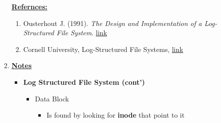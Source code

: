 \documentclass[12pt]{article}
\begin{document}
\begin{enumerate}[1.]
\begin{enumerate}[1)]
        \bigskip

        \underline{\textbf{Refernces:}}

        \bigskip

        \begin{enumerate}[1)]
            \item Ousterhout J. (1991). \textit{The Design and Implementation of a Log-Structured File System}. \href{https://people.eecs.berkeley.edu/~brewer/cs262/LFS.pdf}{link}
            \item Cornell University, Log-Structured File Systems, \href{http://www.cs.cornell.edu/courses/cs4410/2015su/lectures/lec20-lfs.html#:~:text=The%20downside%20of%20storing%20the,or%20inode)%20in%20the%20segment.}{link}
        \end{enumerate}

        \item

        \bigskip

        \underline{\textbf{Notes}}

        \begin{itemize}
            \item \textbf{Log Structured File System (cont')}
            \begin{itemize}
                \item Data Block
                \begin{itemize}
                    \item Is found by looking for \textbf{inode} that point to it
                \end{itemize}

                \bigskip


\end{itemize}
\end{itemize}
\end{enumerate}
\end{enumerate}
\end{document}
